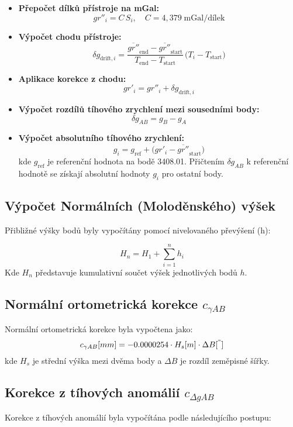 \begin{itemize}
  \item \textbf{Přepočet dílků přístroje na mGal:}
    \[
      gr''_i = C\,S_i,
      \quad C = 4{,}379\;\text{mGal/dílek}
    \]
  \item \textbf{Výpočet chodu přístroje:}
    \[
      \delta g_{\mathrm{drift},i}
        = \frac{\overline{gr''}_{\mathrm{end}} - \overline{gr''}_{\mathrm{start}}}
               {T_{\mathrm{end}} - T_{\mathrm{start}}}
          \,\bigl(T_i - T_{\mathrm{start}}\bigr)
    \]
  \item \textbf{Aplikace korekce z chodu:}
    \[
      gr'_i = gr''_i + \delta g_{\mathrm{drift},i}
    \]
  \item \textbf{Výpočet rozdílů tíhového zrychlení mezi sousedními body:}
    \[
      \delta g_{AB} = g_B - g_A
    \]
  \item \textbf{Výpočet absolutního tíhového zrychlení:}
    \[
      g_i = g_{\mathrm{ref}}
          + \bigl(gr'_i - \overline{gr''}_{\mathrm{start}}\bigr)
    \]
    kde \(g_{\mathrm{ref}}\) je referenční hodnota na bodě 3408.01. Přičtením \(\delta g_{AB}\) k referenční hodnotě se získají absolutní hodnoty \(g_i\) pro ostatní body.
\end{itemize}


\subsection{Výpočet Normálních (Moloděnského) výšek}

Přibližné výšky bodů byly vypočítány pomocí nivelovaného převýšení (h):

\[
H_n = H_1+\sum_{i=1}^n h_i
\]
Kde \( H_n \) představuje kumulativní součet výšek jednotlivých bodů \( h \).
\subsection*{Normální ortometrická korekce \( c_{\gamma AB} \)}
Normální ortometrická korekce byla vypočtena jako: 
\[
c_{\gamma AB}[mm] = -0.0000254 \cdot H_s[m] \cdot \Delta B[^"]
\]
kde \(H_s\) je střední výška mezi dvěma body a \(\Delta B\) je rozdíl zeměpisné šířky.
\subsection*{Korekce z tíhových anomálií \( c_{\Delta g AB} \)}
Korekce z tíhových anomálií byla vypočítána podle následujícího postupu:

